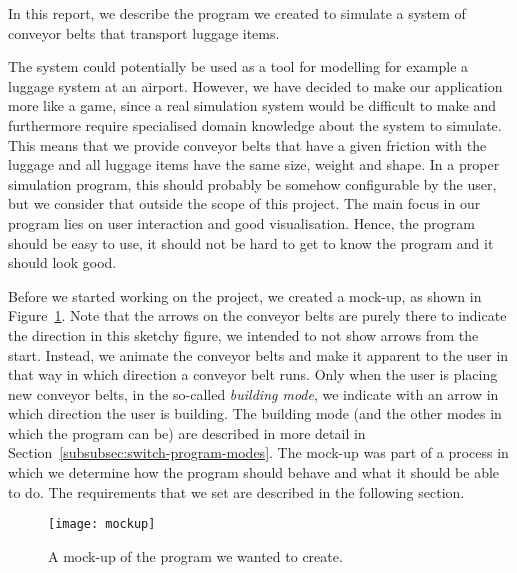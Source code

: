 In this report, we describe the program we created to simulate a system of conveyor belts that transport luggage items.

The system could potentially be used as a tool for modelling for example a luggage system at an airport. However, we have decided to make our application more like a game, since a real simulation system would be difficult to make and furthermore require specialised domain knowledge about the system to simulate. This means that we provide conveyor belts that have a given friction with the luggage and all luggage items have the same size, weight and shape. In a proper simulation program, this should probably be somehow configurable by the user, but we consider that outside the scope of this project. The main focus in our program lies on user interaction and good visualisation. Hence, the program should be easy to use, it should not be hard to get to know the program and it should look good.

Before we started working on the project, we created a mock-up, as shown in Figure~\ref{fig:mockup}. Note that the arrows on the conveyor belts are purely there to indicate the direction in this sketchy figure, we intended to not show arrows from the start. Instead, we animate the conveyor belts and make it apparent to the user in that way in which direction a conveyor belt runs. Only when the user is placing new conveyor belts, in the so-called \emph{building mode}, we indicate with an arrow in which direction the user is building. The building mode (and the other modes in which the program can be) are described in more detail in Section~\ref{subsubsec:switch-program-modes}. The mock-up was part of a process in which we determine how the program should behave and what it should be able to do. The requirements that we set are described in the following section.

\begin{figure}[b!]
  \begin{center}
    \texttt{[image: mockup]}
    \caption{A mock-up of the program we wanted to create.}
    \label{fig:mockup}
  \end{center}
\end{figure}


